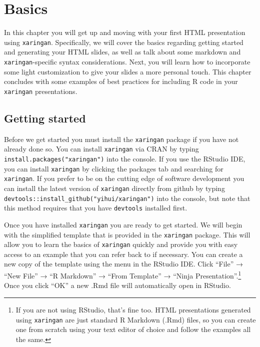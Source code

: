 \documentclass[
]{book}
\begin{document}
\hypertarget{basics}{%
\chapter{Basics}\label{basics}}

In this chapter you will get up and moving with your first HTML presentation using \texttt{xaringan}. Specifically, we will cover the basics regarding getting started and generating your HTML slides, as well as talk about some markdown and \texttt{xaringan}-specific syntax considerations. Next, you will learn how to incorporate some light customization to give your slides a more personal touch. This chapter concludes with some examples of best practices for including R code in your \texttt{xaringan} presentations.

\hypertarget{getting-started}{%
\section{Getting started}\label{getting-started}}

Before we get started you must install the \texttt{xaringan} package if you have not already done so. You can install \texttt{xaringan} via CRAN by typing \texttt{install.packages("xaringan")} into the console. If you use the RStudio IDE, you can install \texttt{xaringan} by clicking the packages tab and searching for \texttt{xaringan}. If you prefer to be on the cutting edge of software development you can install the latest version of \texttt{xaringan} directly from github by typing \texttt{devtools::install\_github("yihui/xaringan")} into the console, but note that this method requires that you have \texttt{devtools} installed first.

Once you have installed \texttt{xaringan} you are ready to get started. We will begin with the simplified template that is provided in the \texttt{xaringan} package. This will allow you to learn the basics of \texttt{xaringan} quickly and provide you with easy access to an example that you can refer back to if necessary. You can create a new copy of the template using the menu in the RStudio IDE. Click ``File'' → ``New File'' → ``R Markdown'' → ``From Template'' → ``Ninja Presentation''.\footnote{If you are not using RStudio, that's fine too. HTML presentations generated using \texttt{xaringan} are just standard R Markdown (.Rmd) files, so you can create one from scratch using your text editor of choice and follow the examples all the same.} Once you click ``OK'' a new .Rmd file will automatically open in RStudio.
\end{document}
